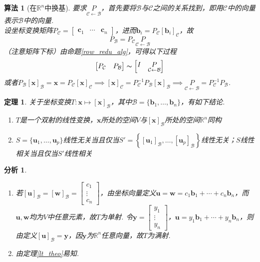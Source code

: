 \documentclass[11pt,UTF8]{ctexart}
\newtheorem{theorem}{定理}
\newtheorem{algorithm}{算法}
\newtheorem*{analysis}{分析}
\def\vx{\mathbf{x}}
\def\vu{\mathbf{u}}
\def\rn{\mathbb{R}^n}
\newcommand{\vb}[1]{\mathbf{#1}}
\newcommand{\bmat}[2]{\begin{bmatrix}{#1}&\cdots&{#2}\end{bmatrix}}
\begin{document}
\begin{algorithm}[在$\rn$中换基]
要求$\underset{\mathcal{C}\gets \mathcal{B}}{P}$，首先要将$\mathcal{B}$与$\mathcal{C}$之间的关系找到，即用$\mathcal{C}$中的向量表示$\mathcal{B}$中的向量.\\
设坐标变换矩阵$P_\mathcal{C}=\bmat{\vb{c}_1}{\vb{c}_n}$，进而$\vb{b}_i=P_{\mathcal{C}}[\vb{b}_i]_{\mathcal{C}}$，故
\[P_{\mathcal{B}}=P_{\mathcal{C}}\underset{\mathcal{C}\gets \mathcal{B}}{P}\]
（注意矩阵下标）由命题\ref{row_redu_alg}，可得以下过程
\[\begin{bmatrix}P_\mathcal{C}&P_\mathcal{B}\end{bmatrix}\thicksim\begin{bmatrix}I&\underset{\mathcal{C}\gets \mathcal{B}}{P}\end{bmatrix}\]
或者$P_\mathcal{B}[\vx]_\mathcal{B}=\vx=P_\mathcal{C}[\vx]_\mathcal{C}\implies [\vx]_\mathcal{C}=P_\mathcal{C}^{-1}P_\mathcal{B}[\vx]_\mathcal{B}\implies \underset{\mathcal{C}\gets \mathcal{B}}{P}=P_{\mathcal{C}}^{-1}P_{\mathcal{B}}$.
\end{algorithm}
\begin{theorem}%
关于坐标变换$T:\vx\mapsto[\vx]_{\mathcal{B}}$，其中$\mathcal{B}=\{\vb{b}_1,\dots,\vb{b}_n\}$，有如下结论.
\begin{enumerate}
	\itemsep -3pt
	\item $T$是一个双射的线性变换，$\vx$所处的空间$V$与$[\vx]_\mathcal{B}$所处的空间$\rn$同构
	\item $S=\{\vb{u}_1,\dots,\vb{u}_p\}$线性无关当且仅当$S'=\left\{[\vb{u}_1]_\mathcal{B},\dots,[\vb{u}_p]_\mathcal{B}\right\}$线性无关；$S$线性相关当且仅当$S'$线性相关
\end{enumerate}
\end{theorem}
\begin{analysis}
\begin{enumerate}
	\itemsep -3pt
	\item 若$[\vu]_\mathcal{B}=[\vb{w}]_\mathcal{B}=\begin{bmatrix}c_1\\\vdots\\c_n\end{bmatrix}$，由坐标向量定义$\vb{u}=\vb{w}=c_1\vb{b}_1+\cdots+c_n\vb{b}_n$，而$\vb{u},\vb{w}$均为$V$中任意元素，故$T$为单射. 令$\vb{y}=\begin{bmatrix}y_1\\\vdots\\y_n\end{bmatrix}$，$\vb{u}=y_1\vb{b}_1+\cdots+y_n\vb{b}_n$，则由定义$[\vb{u}]_\mathcal{B}=\vb{y}$，因$\vb{y}$为$\rn$任意向量，故$T$为满射.
	\item 由定理\ref{lt_theo}易知.
\end{enumerate}
\end{analysis}
\end{document}
